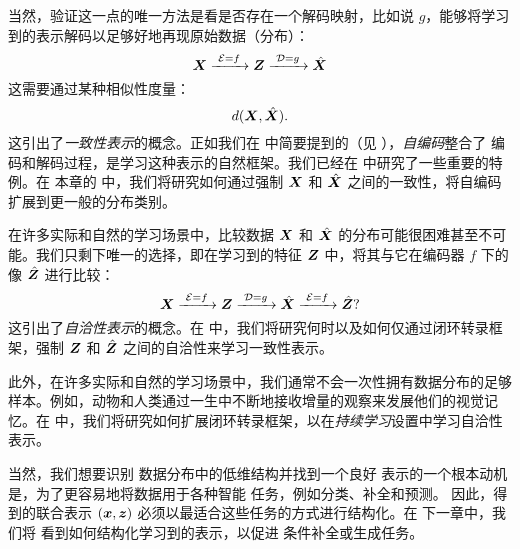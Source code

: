 \documentclass[../../book-main_zh.tex]{subfiles}
\begin{document}
当然，验证这一点的唯一方法是看是否存在一个解码映射，比如说 $g$，能够将学习到的表示解码以足够好地再现原始数据（分布）：
\begin{equation}
  \bm{X}
  \xrightarrow{\hspace{1mm} \mathcal{E} = f \hspace{1mm}} \bm{Z}
  \xrightarrow{\hspace{1mm} \mathcal{D} = g \hspace{1mm}} \hat{\bm{X}}
\end{equation}
这需要通过某种相似性度量：
\begin{equation}
  d(\bm{X}, \hat {\bm{X}}).
\end{equation}
这引出了{\em 一致性表示}的概念。正如我们在
 中简要提到的（见 ），{\em 自编码}整合了
编码和解码过程，是学习这种表示的自然框架。我们已经在  中研究了一些重要的特例。在
本章的  中，我们将研究如何通过强制 $\bm{X}$ 和 $\hat {\bm{X}}$ 之间的一致性，将自编码扩展到更一般的分布类别。

在许多实际和自然的学习场景中，比较数据 $\bm{X}$ 和 $\hat {\bm{X}}$ 的分布可能很困难甚至不可能。我们只剩下唯一的选择，即在学习到的特征 $\bm{Z}$ 中，将其与它在编码器 $f$ 下的像 $\hat {\bm{Z}}$ 进行比较：
\begin{equation}
 \bm{X}
\xrightarrow{\hspace{1mm} \mathcal{E} = f \hspace{1mm}} \bm{Z}  \xrightarrow{\hspace{1mm} \mathcal{D} = g \hspace{1mm}} \hat{\bm{X}} \xrightarrow{\hspace{1mm} \mathcal{E} = f \hspace{1mm}} \hat {\bm{Z}}?
\end{equation}
这引出了{\em 自洽性表示}的概念。在  中，我们将研究何时以及如何仅通过闭环转录框架，强制 $\bm{Z}$ 和 $\hat {\bm{Z}}$ 之间的自洽性来学习一致性表示。

此外，在许多实际和自然的学习场景中，我们通常不会一次性拥有数据分布的足够样本。例如，动物和人类通过一生中不断地接收增量的观察来发展他们的视觉记忆。在  中，我们将研究如何扩展闭环转录框架，以在{\em 持续学习}设置中学习自洽性表示。

当然，我们想要识别
数据分布中的低维结构并找到一个良好
表示的一个根本动机是，为了更容易地将数据用于各种智能
任务，例如分类、补全和预测。
因此，得到的联合表示 $(\bm{x}, \bm{z})$ 必须以最适合这些任务的方式进行结构化。在
下一章中，我们将
看到如何结构化学习到的表示，以促进
条件补全或生成任务。
\end{document}
